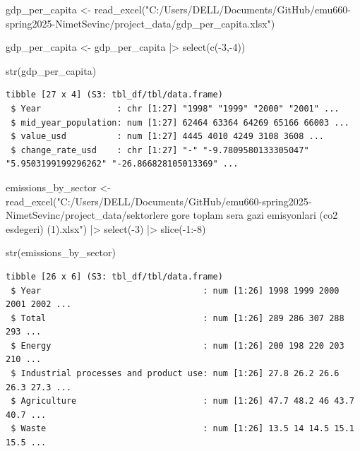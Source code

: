 \documentclass[
  letterpaper,
  DIV=11,
  numbers=noendperiod]{scrartcl}
\newenvironment{Shaded}{\begin{snugshade}}{\end{snugshade}}
\newcommand{\DecValTok}[1]{\textcolor[rgb]{0.68,0.00,0.00}{#1}}
\newcommand{\FunctionTok}[1]{\textcolor[rgb]{0.28,0.35,0.67}{#1}}
\newcommand{\NormalTok}[1]{\textcolor[rgb]{0.00,0.23,0.31}{#1}}
\newcommand{\OtherTok}[1]{\textcolor[rgb]{0.00,0.23,0.31}{#1}}
\newcommand{\SpecialCharTok}[1]{\textcolor[rgb]{0.37,0.37,0.37}{#1}}
\newcommand{\StringTok}[1]{\textcolor[rgb]{0.13,0.47,0.30}{#1}}
\begin{document}
\begin{Shaded}
\begin{Highlighting}[]
\NormalTok{gdp\_per\_capita }\OtherTok{\textless{}{-}} \FunctionTok{read\_excel}\NormalTok{(}\StringTok{"C:/Users/DELL/Documents/GitHub/emu660{-}spring2025{-}NimetSevinc/project\_data/gdp\_per\_capita.xlsx"}\NormalTok{)  }
  
\NormalTok{gdp\_per\_capita }\OtherTok{\textless{}{-}}\NormalTok{ gdp\_per\_capita }\SpecialCharTok{|\textgreater{}} \FunctionTok{select}\NormalTok{(}\FunctionTok{c}\NormalTok{(}\SpecialCharTok{{-}}\DecValTok{3}\NormalTok{,}\SpecialCharTok{{-}}\DecValTok{4}\NormalTok{))}
  
\FunctionTok{str}\NormalTok{(gdp\_per\_capita)}
\end{Highlighting}
\end{Shaded}

\begin{verbatim}
tibble [27 x 4] (S3: tbl_df/tbl/data.frame)
 $ Year               : chr [1:27] "1998" "1999" "2000" "2001" ...
 $ mid_year_population: num [1:27] 62464 63364 64269 65166 66003 ...
 $ value_usd          : num [1:27] 4445 4010 4249 3108 3608 ...
 $ change_rate_usd    : chr [1:27] "-" "-9.7809580133305047" "5.9503199199296262" "-26.866828105013369" ...
\end{verbatim}

\begin{Shaded}
\begin{Highlighting}[]
\NormalTok{emissions\_by\_sector }\OtherTok{\textless{}{-}} \FunctionTok{read\_excel}\NormalTok{(}\StringTok{"C:/Users/DELL/Documents/GitHub/emu660{-}spring2025{-}NimetSevinc/project\_data/sektorlere gore toplam sera gazi emisyonlari (co2 esdegeri) (1).xlsx"}\NormalTok{) }\SpecialCharTok{|\textgreater{}} \FunctionTok{select}\NormalTok{(}\SpecialCharTok{{-}}\DecValTok{3}\NormalTok{) }\SpecialCharTok{|\textgreater{}} \FunctionTok{slice}\NormalTok{(}\SpecialCharTok{{-}}\DecValTok{1}\SpecialCharTok{:{-}}\DecValTok{8}\NormalTok{)}


\FunctionTok{str}\NormalTok{(emissions\_by\_sector)}
\end{Highlighting}
\end{Shaded}

\begin{verbatim}
tibble [26 x 6] (S3: tbl_df/tbl/data.frame)
 $ Year                                : num [1:26] 1998 1999 2000 2001 2002 ...
 $ Total                               : num [1:26] 289 286 307 288 293 ...
 $ Energy                              : num [1:26] 200 198 220 203 210 ...
 $ Industrial processes and product use: num [1:26] 27.8 26.2 26.6 26.3 27.3 ...
 $ Agriculture                         : num [1:26] 47.7 48.2 46 43.7 40.7 ...
 $ Waste                               : num [1:26] 13.5 14 14.5 15.1 15.5 ...
\end{verbatim}
\end{document}
